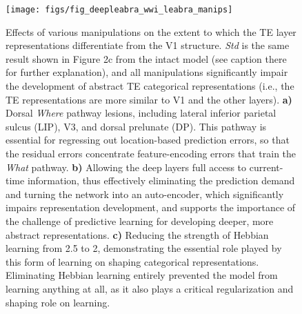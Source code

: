 \documentclass[12pt,twoside]{article}
\newif\myifpdf
\begin{document}
\begin{figure}
  \centering\texttt{[image: figs/fig\_deepleabra\_wwi\_leabra\_manips]}
  \caption{\small Effects of various manipulations on the extent to which the TE layer representations differentiate from the V1 structure.  {\em Std} is the same result shown in Figure 2c from the intact model (see caption there for further explanation), and all manipulations significantly impair the development of abstract TE categorical representations (i.e., the TE representations are more similar to V1 and the other layers).  {\bf a)} Dorsal {\em Where} pathway lesions, including lateral inferior parietal sulcus (LIP), V3, and dorsal prelunate (DP).  This pathway is essential for regressing out location-based prediction errors, so that the residual errors concentrate feature-encoding errors that train the {\em What} pathway.  {\bf b)} Allowing the deep layers full access to current-time information, thus effectively eliminating the prediction demand and turning the network into an auto-encoder, which significantly impairs representation development, and supports the importance of the challenge of predictive learning for developing deeper, more abstract representations.  {\bf c)} Reducing the strength of Hebbian learning from 2.5 to 2, demonstrating the essential role played by this form of learning on shaping categorical representations.  Eliminating Hebbian learning entirely prevented the model from learning anything at all, as it also plays a critical regularization and shaping role on learning.}
  \label{fig.manips}
\end{figure}

\end{document}
